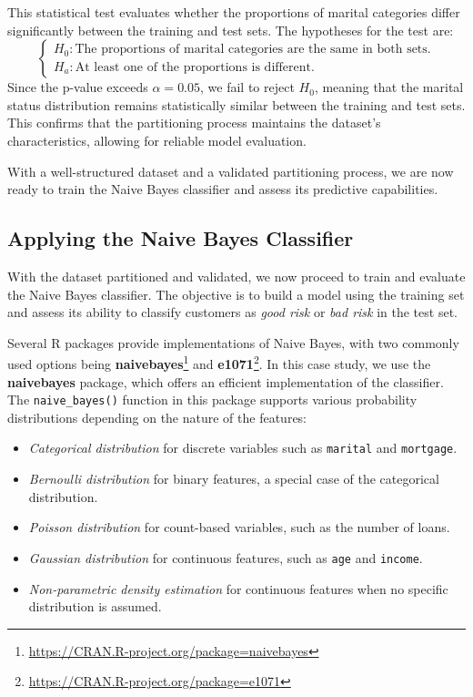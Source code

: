 \documentclass[
  11pt,
]{book}
\providecommand{\tightlist}{%
  \setlength{\itemsep}{0pt}\setlength{\parskip}{0pt}}
\renewcommand{\href}[2]{#2\footnote{\url{#1}}}
\theoremstyle{definition}
\theoremstyle{definition}
\theoremstyle{definition}
\theoremstyle{definition}
\theoremstyle{remark}
\begin{document}
This statistical test evaluates whether the proportions of marital categories differ significantly between the training and test sets. The hypotheses for the test are:\\
\[
\begin{cases}
H_0:  \text{The proportions of marital categories are the same in both sets.}\\
H_a:  \text{At least one of the proportions is different.}
\end{cases}
\]
Since the p-value exceeds \(\alpha = 0.05\), we fail to reject \(H_0\), meaning that the marital status distribution remains statistically similar between the training and test sets. This confirms that the partitioning process maintains the dataset's characteristics, allowing for reliable model evaluation.

With a well-structured dataset and a validated partitioning process, we are now ready to train the Naive Bayes classifier and assess its predictive capabilities.

\subsection*{Applying the Naive Bayes Classifier}\label{applying-the-naive-bayes-classifier}


With the dataset partitioned and validated, we now proceed to train and evaluate the Naive Bayes classifier. The objective is to build a model using the training set and assess its ability to classify customers as \emph{good risk} or \emph{bad risk} in the test set.

Several R packages provide implementations of Naive Bayes, with two commonly used options being \href{https://CRAN.R-project.org/package=naivebayes}{\textbf{naivebayes}} and \href{https://CRAN.R-project.org/package=e1071}{\textbf{e1071}}. In this case study, we use the \textbf{naivebayes} package, which offers an efficient implementation of the classifier. The \texttt{naive\_bayes()} function in this package supports various probability distributions depending on the nature of the features:

\begin{itemize}
\tightlist
\item
  \emph{Categorical distribution} for discrete variables such as \texttt{marital} and \texttt{mortgage}.\\
\item
  \emph{Bernoulli distribution} for binary features, a special case of the categorical distribution.\\
\item
  \emph{Poisson distribution} for count-based variables, such as the number of loans.\\
\item
  \emph{Gaussian distribution} for continuous features, such as \texttt{age} and \texttt{income}.\\
\item
  \emph{Non-parametric density estimation} for continuous features when no specific distribution is assumed.
\end{itemize}
\end{document}
